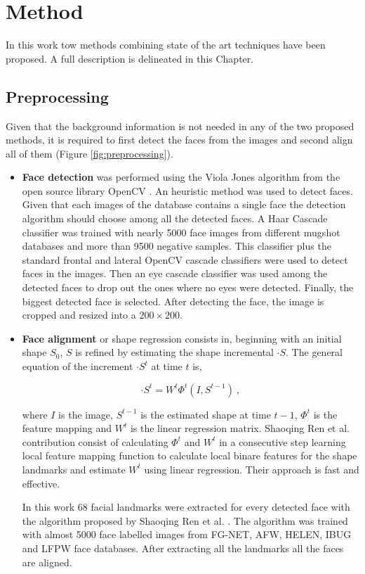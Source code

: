 \chapter{Method} \label{chap:method}
In this work tow methods combining state of the art techniques have been proposed. A full description is delineated in this Chapter.

\section{Preprocessing}\label{sec:preproces}

Given that the background information is not needed in any of the two proposed methods, it is required to first detect the faces from the images and second align all of them (Figure \ref{fig:preprocessing}).

\begin{itemize}
	\item \textbf{Face detection} was performed using the Viola Jones algorithm from the open source library OpenCV \cite{opencv_library}. An heuristic method was used to detect faces. Given that each images of the database contains a single face the detection algorithm should choose among all the detected faces. A Haar Cascade classifier was trained with nearly 5000 face images from different mugshot databases and more than 9500 negative samples. This classifier plus the standard frontal and lateral OpenCV cascade classifiers were used to detect faces in the images. Then an eye cascade classifier was used among the detected faces to drop out the ones where no eyes were detected. Finally, the biggest detected face is selected. After detecting the face, the image is cropped and resized into a $200 \times 200$.
	
	\item \textbf{Face alignment} or shape regression consists in, beginning with an initial shape $S_0$, $S$ is refined by estimating the shape incremental $·S$. The general equation of the increment $·S^t$ at time $t$ is,
	
	\begin{equation}
	·S^t = W^t\Phi^t(I, S^{t-1})\ ,
	\end{equation} 
	
	where $I$ is the image, $S^{t-1}$ is the estimated shape at time $t-1$, $\Phi^t$ is the feature mapping and $W^t$ is the linear regression matrix. Shaoqing Ren et al. \cite{ren2014face} contribution consist of calculating $\Phi^t$ and $W^t$ in a consecutive step learning local feature mapping function to calculate local binare features for the shape landmarks and  estimate $W^t$ using linear regression. Their approach is fast and effective.
	
	In this work 68 facial landmarks were extracted for every detected face with the algorithm proposed by Shaoqing Ren et al. \cite{ren2014face}. The algorithm was trained with almost 5000 face labelled images from FG-NET, AFW, HELEN, IBUG and LFPW face databases. After extracting all the landmarks all the faces are aligned.
\end{itemize}

